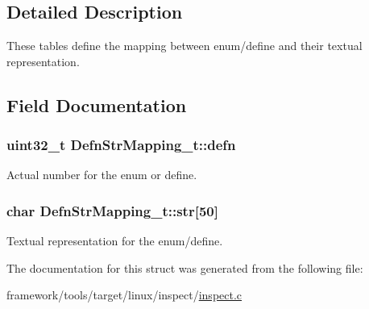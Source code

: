 \subsection{Detailed Description}
These tables define the mapping between enum/define and their textual representation. 

\subsection{Field Documentation}
\subsubsection[{\texorpdfstring{defn}{defn}}]{\setlength{\rightskip}{0pt plus 5cm}uint32\+\_\+t Defn\+Str\+Mapping\+\_\+t\+::defn}\hypertarget{struct_defn_str_mapping__t_ad5114f65b4eeea55b356bef3aaca050a}{}\label{struct_defn_str_mapping__t_ad5114f65b4eeea55b356bef3aaca050a}


Actual number for the enum or define. 

\subsubsection[{\texorpdfstring{str}{str}}]{\setlength{\rightskip}{0pt plus 5cm}char Defn\+Str\+Mapping\+\_\+t\+::str\mbox{[}50\mbox{]}}\hypertarget{struct_defn_str_mapping__t_a3ef8f1bca4f8a41b84b9a55c5528408e}{}\label{struct_defn_str_mapping__t_a3ef8f1bca4f8a41b84b9a55c5528408e}


Textual representation for the enum/define. 



The documentation for this struct was generated from the following file\+:\begin{DoxyCompactItemize}
\item 
framework/tools/target/linux/inspect/\hyperlink{inspect_8c}{inspect.\+c}\end{DoxyCompactItemize}
